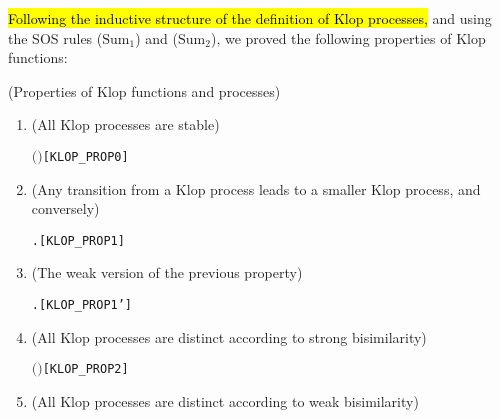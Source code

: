 \hl{Following the inductive structure of the definition of Klop processes,}
  and using the SOS rules
  ($\mathrm{Sum}_1$) and ($\mathrm{Sum}_2$), we proved
the following properties of Klop functions:
\begin{proposition}{(Properties of Klop functions and processes)}
\begin{enumerate}
\item (All Klop processes are stable)
\begin{alltt}
\HOLTokenTurnstile{}  \ensuremath{(}  \ensuremath{)}\hfill[KLOP_PROP0]
\end{alltt}
\item (Any transition from a Klop process leads to a smaller Klop
  process, and conversely)
\begin{alltt}
\HOLTokenTurnstile{}    \HOLTokenTransBegin{} \HOLTokenTransEnd {} \HOLSymConst{\HOLTokenEquiv{}} \HOLSymConst{\HOLTokenExists{}}.  \HOLSymConst{\HOLTokenLt{}}  \HOLSymConst{\HOLTokenConj{}}  \HOLSymConst{\ensuremath{=}}   \hfill{[KLOP_PROP1]}
\end{alltt}
\item (The weak version of the previous property)
\begin{alltt}
\HOLTokenTurnstile{}    \HOLTokenWeakTransBegin{} \HOLTokenWeakTransEnd {} \HOLSymConst{\HOLTokenEquiv{}} \HOLSymConst{\HOLTokenExists{}}.  \HOLSymConst{\HOLTokenLt{}}  \HOLSymConst{\HOLTokenConj{}}  \HOLSymConst{\ensuremath{=}}   \hfill{[KLOP_PROP1']}
\end{alltt}
\item (All Klop processes are distinct according to strong bisimilarity)
\begin{alltt}
\HOLTokenTurnstile{}  \HOLSymConst{\HOLTokenLt{}}  \HOLSymConst{\HOLTokenImp{}} \HOLSymConst{\HOLTokenNeg{}}\ensuremath{(}   \HOLSymConst{\HOLTokenStrongEQ}   \ensuremath{)}\hfill{[KLOP_PROP2]}
\end{alltt}
\item (All Klop processes are distinct according to weak bisimilarity)

\end{enumerate}
\end{proposition}
